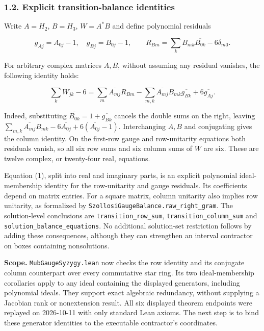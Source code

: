 \documentclass[
]{article}
\begin{document}
\subsubsection{1.2. Explicit transition-balance
identities}\label{explicit-transition-balance-identities}

Write \(A=H_2\), \(B=H_3\), \(W=A^*B\) and define polynomial residuals

\[
g_{Aj}=A_{0j}-1,\quad g_{Bj}=B_{0j}-1,\qquad
R_{Bm}=\sum_k B_{mk}\overline{B_{0k}}-6\delta_{m0}.
\]

For arbitrary complex matrices \(A,B\), without assuming any residual
vanishes, the following identity holds:

\[
\sum_k W_{jk}-6
=\sum_m\overline{A_{mj}}R_{Bm}
-\sum_{m,k}\overline{A_{mj}}B_{mk}\overline{g_{Bk}}
+6\overline{g_{Aj}}. \tag{1}
\]

Indeed, substituting \(\overline{B_{0k}}=1+\overline{g_{Bk}}\) cancels
the double sums on the right, leaving
\(\sum_{m,k}\overline{A_{mj}}B_{mk}-6\overline{A_{0j}}
+6(\overline{A_{0j}}-1)\). Interchanging \(A,B\) and conjugating gives
the column identity. On the first-row gauge and row-unitarity equations
both residuals vanish, so all six row sums and six column sums of \(W\)
are six. These are twelve complex, or twenty-four real, equations.

Equation (1), split into real and imaginary parts, is an explicit
polynomial ideal-membership identity for the row-unitarity and gauge
residuals. Its coefficients depend on matrix entries. For a square
matrix, column unitarity also implies row unitarity, as formalized by
\nolinkurl{SzollosiGaugeBalance.raw_right_gram}. The solution-level
conclusions are \nolinkurl{transition_row_sum},
\nolinkurl{transition_column_sum} and
\nolinkurl{solution_balance_equations}. No additional solution-set
restriction follows by adding these consequences, although they can
strengthen an interval contractor on boxes containing nonsolutions.

\textbf{Scope.} \nolinkurl{MubGaugeSyzygy.lean} now checks the row
identity and its conjugate column counterpart over every commutative
star ring. Its two ideal-membership corollaries apply to any ideal
containing the displayed generators, including polynomial ideals. They
support exact algebraic redundancy, without supplying a Jacobian rank or
nonextension result. All six displayed theorem endpoints were replayed
on 2026-10-11 with only standard Lean axioms. The next step is to bind
these generator identities to the executable contractor's coordinates.
\end{document}
